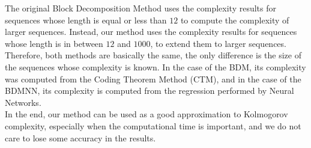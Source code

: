 The original Block Decomposition Method uses the complexity results for sequences whose length is equal or less than $12$ to compute the complexity of larger sequences. Instead, our method uses the complexity results for sequences whose length is in between $12$ and $1000$, to extend them to larger sequences. Therefore, both methods are basically the same, the only difference is the size of the sequences whose complexity is known. In the case of the BDM, its complexity was computed from the Coding Theorem Method (CTM), and in the case of the BDMNN, its complexity is computed from the regression performed by Neural Networks.\\

In the end, our method can be used as a good approximation to Kolmogorov complexity, especially when the computational time is important, and we do not care to lose some accuracy in the results.




